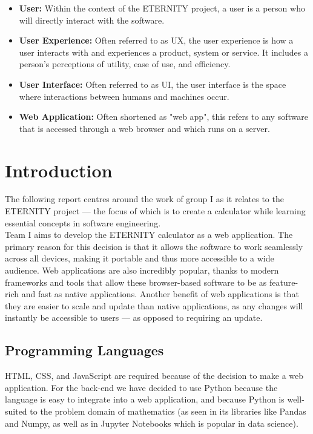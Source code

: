 \documentclass[11pt,onside]{report}
\begin{document}
\begin{itemize}
    \item \textbf{User:} Within the context of the ETERNITY project, a user is a person who will directly interact with the software.
    
    \item \textbf{User Experience:} Often referred to as UX, the user experience is how a user interacts with and experiences a product, system or service. It includes a person's perceptions of utility, ease of use, and efficiency. \cite{ux}
    
    \item \textbf{User Interface:} Often referred to as UI, the user interface is the space where interactions between humans and machines occur. \cite{ui}
    
    \item \textbf{Web Application:} Often shortened as "web app", this refers to any software that is accessed through a web browser and which runs on a server. \cite{webapp}
    
\end{itemize}

\section{Introduction}

The following report centres around the work of group I as it relates to the ETERNITY project — the focus of which is to create a calculator while learning essential concepts in software engineering. \\

Team I aims to develop the ETERNITY calculator as a web application. The primary reason for this decision is that it allows the software to work seamlessly across all devices, making it portable and thus more accessible to a wide audience. Web applications are also incredibly popular, thanks to modern frameworks and tools that allow these browser-based software to be as feature-rich and fast as native applications. Another benefit of web applications is that they are easier to scale and update than native applications, as any changes will instantly be accessible to users — as opposed to requiring an update.

\subsection{Programming Languages}

HTML, CSS, and JavaScript are required because of the decision to make a web application. For the back-end we have decided to use Python because the language is easy to integrate into a web application, and because Python is well-suited to the problem domain of mathematics (as seen in its libraries like Pandas and Numpy, as well as in Jupyter Notebooks which is popular in data science).
\end{document}
